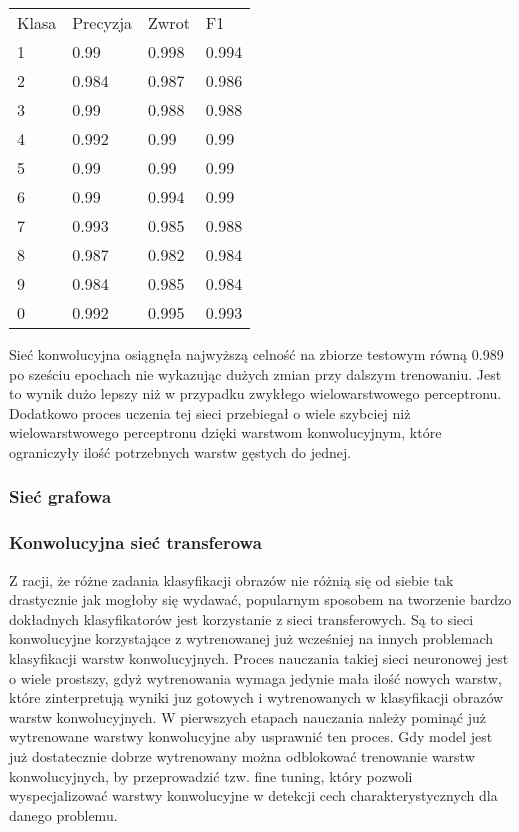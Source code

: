\documentclass{article}
\begin{document}
\begin{table}[]
\begin{tabular}{llll}
Klasa & Precyzja & Zwrot & F1    \\
1     & 0.99     & 0.998 & 0.994 \\
2     & 0.984    & 0.987 & 0.986 \\
3     & 0.99     & 0.988 & 0.988 \\
4     & 0.992    & 0.99  & 0.99  \\
5     & 0.99     & 0.99  & 0.99  \\
6     & 0.99     & 0.994 & 0.99  \\
7     & 0.993    & 0.985 & 0.988 \\
8     & 0.987    & 0.982 & 0.984 \\
9     & 0.984    & 0.985 & 0.984 \\
0     & 0.992    & 0.995 & 0.993
\end{tabular}
\end{table}

Sieć konwolucyjna osiągnęła najwyższą celność na zbiorze testowym równą 0.989 po sześciu epochach nie wykazując dużych zmian przy dalszym trenowaniu. Jest to wynik dużo lepszy niż w przypadku zwykłego wielowarstwowego perceptronu. Dodatkowo proces uczenia tej sieci przebiegał o wiele szybciej niż wielowarstwowego perceptronu dzięki warstwom konwolucyjnym, które ograniczyły ilość potrzebnych warstw gęstych do jednej.



\subsubsection{Sieć grafowa}

\subsubsection{Konwolucyjna sieć transferowa}
Z racji, że różne zadania klasyfikacji obrazów nie różnią się od siebie tak drastycznie jak mogłoby się wydawać, popularnym sposobem na tworzenie bardzo dokładnych klasyfikatorów jest korzystanie z sieci transferowych. Są to sieci konwolucyjne korzystające z wytrenowanej już wcześniej na innych problemach klasyfikacji warstw konwolucyjnych. Proces nauczania takiej sieci neuronowej jest o wiele prostszy, gdyż wytrenowania wymaga jedynie mała ilość nowych warstw, które zinterpretują wyniki juz gotowych i wytrenowanych w klasyfikacji obrazów warstw konwolucyjnych. W pierwszych etapach nauczania należy pominąć już wytrenowane warstwy konwolucyjne aby usprawnić ten proces. Gdy model jest już dostatecznie dobrze wytrenowany można odblokować trenowanie warstw konwolucyjnych, by przeprowadzić tzw. fine tuning, który pozwoli wyspecjalizować warstwy konwolucyjne w detekcji cech charakterystycznych dla danego problemu. 
\end{document}
